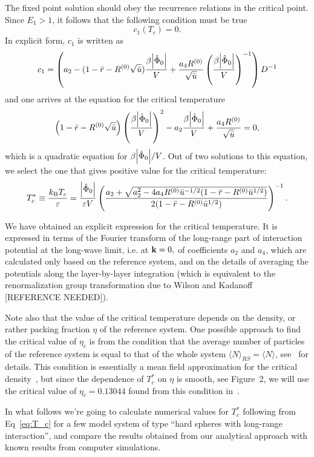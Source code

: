 The fixed point solution should obey the recurrence relations in the critical point. Since $E_1 > 1$, it follows that the following condition must be true
\begin{equation*}
	c_1(T_c) = 0.
\end{equation*}
In explicit form, $c_1$ is written as
\begin{equation*}
	c_1 = 
	\left(
		a_2 - (1 - \bar{r} - R^{(0)}\sqrt{\bar{u}})\frac{\beta \abs{\hat{\Phi}_0}}{V} + \frac{a_4 R^{(0)}}{\sqrt{\bar{u}}} \left(\frac{\beta \abs{\hat{\Phi}_0}}{V}\right)^{-1}
	\right) D^{-1}
\end{equation*}
and one arrives at the equation for the critical temperature
\begin{equation}
	\left(1 - \bar{r} - R^{(0)}\sqrt{\bar{u}} \right) \left(\frac{\beta \abs{\hat{\Phi}_0}}{V}\right)^{2} - a_2  \frac{\beta \abs{\hat{\Phi}_0}}{V} + \frac{a_4 R^{(0)}}{\sqrt{\bar{u}}} = 0,
\end{equation}
which is a quadratic equation for $\beta \abs{\hat{\Phi}_0}/{V}$. Out of two solutions to this equation, we select the one that gives positive value for the critical temperature:
\begin{equation}
	\label{eq:T_c}
	T^*_c \equiv \frac{k_{\rm B} T_c}{\varepsilon} = \frac{\abs{\hat{\Phi}_0}}{\varepsilon V}
	\left(
		\frac
		{a_2 + \sqrt{a_2^2 - 4 a_4 R^{(0)}\bar{u}^{-1/2} (1 - \bar{r} - R^{(0)}\bar{u}^{1/2}) } }
		{2(1 - \bar{r} - R^{(0)}\bar{u}^{1/2})}
	\right)^{-1}.
\end{equation}

We have obtained an explicit expression for the critical temperature. It is expressed in terms of the Fourier transform of the long-range part of interaction potential at the long-wave limit, i.e. at $\vb k = 0,$ of coefficients $a_2$ and $a_4$, which are calculated only based on the reference system, and on the details of averaging the potentials along the layer-by-layer integration (which is equivalent to the renormalization group transformation due to Wilson and Kadanoff [REFERENCE NEEDED]). 

Note also that the value of the critical temperature depends on the density, or rather packing fraction $\eta$ of the reference system. One possible approach to find the critical value of $\eta_c$ is from the condition that the average number of particles of the reference system is equal to that of the whole system $\langle N \rangle_{RS} = \langle N \rangle$, see~\cite{RomaJPS2024} for details. This condition is essentially a mean field approximation for the critical density~\cite{CaillolPatsahan2005,CaillolPatsahan2006}, but since the dependence of $T^*_c$ on $\eta$ is smooth, see Figure~2, we will use the critical value of $\eta_c = 0.13044$ found from this condition in~\cite{YukhJSP1995}.

In what follows we're going to calculate numerical values for $T^*_c$ following from Eq~\eqref{eq:T_c} for a few model system of type ``hard spheres with long-range interaction'', and compare the results obtained from our analytical approach with known results from computer simulations.
